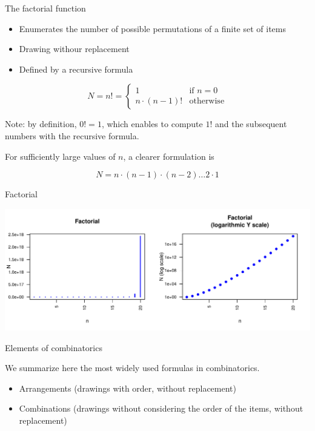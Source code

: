 \documentclass[ignorenonframetext,]{beamer}
\providecommand{\tightlist}{%
  \setlength{\itemsep}{0pt}\setlength{\parskip}{0pt}}
\begin{document}
\begin{frame}{The factorial function}
\protect\hypertarget{the-factorial-function}{}

\begin{itemize}
\tightlist
\item
  Enumerates the number of possible permutations of a finite set of
  items
\item
  Drawing withour replacement
\item
  Defined by a recursive formula
\end{itemize}

\[N = n! = \left\{
                \begin{array}{ll}
                  1 & \text{if } n=0 \\
                  n \cdot (n-1)! &\text{otherwise}
                \end{array}
              \right.\]

Note: by definition, \(0! = 1\), which enables to compute \(1!\) and the
subsequent numbers with the recursive formula.

For sufficiently large values of \(n\), a clearer formulation is

\[N = n \cdot (n-1) \cdot (n-2) \ldots 2 \cdot 1\]

\end{frame}

\begin{frame}{Factorial}
\protect\hypertarget{factorial}{}

\begin{center}\includegraphics[width=0.95\linewidth]{figures/02_combinatorics_factorial-1} \end{center}

\end{frame}

\begin{frame}{Elements of combinatorics}
\protect\hypertarget{elements-of-combinatorics}{}

We summarize here the most widely used formulas in combinatorics.

\begin{itemize}
\tightlist
\item
  Arrangements (drawings with order, without replacement)
\item
  Combinations (drawings without considering the order of the items,
  without replacement)
\end{itemize}

\end{frame}
\end{document}
